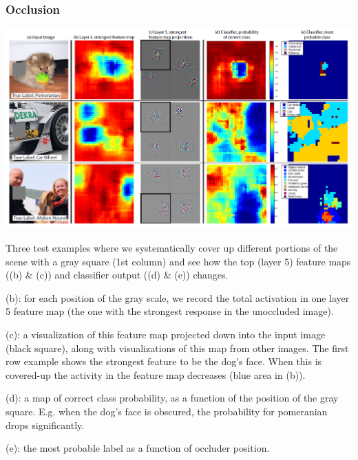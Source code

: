 \begin{frame}[allowframebreaks]
	\frametitle{Occlusion}

	\begin{center}
		\includegraphics[scale=0.5]{figs/ZFNet_occlusion}
	\end{center}

\framebreak

Three test examples where we systematically cover up different portions of the scene with a gray square (1st
column) and see how the top (layer 5) feature maps ((b) \& (c)) and classifier output ((d) \& (e)) changes.

\medskip


(b): for each
position of the gray scale, we record the total activation in one layer 5 feature map (the one with the strongest response
in the unoccluded image).

\smallskip

(c): a visualization of this feature map projected down into the input image (black square), along with visualizations of this map from other images. The first row example shows the strongest feature to be the
dog's face. When this is covered-up the activity in the feature map decreases (blue area in (b)).

\smallskip
(d): a map of correct
class probability, as a function of the position of the gray square. E.g. when the dog's face is obscured, the probability
for pomeranian drops significantly.

\smallskip
(e): the most probable label as a function of occluder position.
\end{frame}











